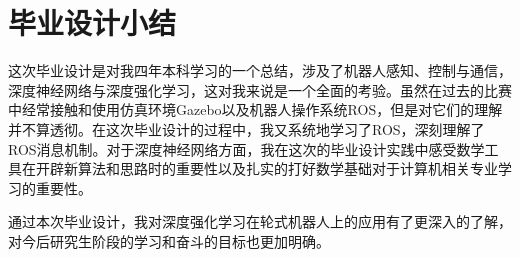 \chapter*{毕业设计小结}
这次毕业设计是对我四年本科学习的一个总结，涉及了机器人感知、控制与通信，深度神经网络与深度强化学习，这对我来说是一个全面的考验。虽然在过去的比赛中经常接触和使用仿真环境Gazebo以及机器人操作系统ROS，但是对它们的理解并不算透彻。在这次毕业设计的过程中，我又系统地学习了ROS，深刻理解了ROS消息机制。对于深度神经网络方面，我在这次的毕业设计实践中感受数学工具在开辟新算法和思路时的重要性以及扎实的打好数学基础对于计算机相关专业学习的重要性。

通过本次毕业设计，我对深度强化学习在轮式机器人上的应用有了更深入的了解，对今后研究生阶段的学习和奋斗的目标也更加明确。




